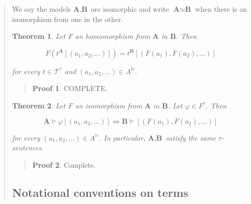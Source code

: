\documentclass[a4paper, 12pt]{article}
\newtheorem{theorem}{Theorem}
\theoremstyle{definition}
\theoremstyle{definition}
\theoremstyle{definition}
\newtheorem{pro}{Proof}
\begin{document}
\begin{quote}
We say the models $\textbf{A}, \textbf{B}$ are isomorphic and write $\textbf{A}
\simeq \textbf{B}$ when there is an isomorphism from one in the other.

\begin{theorem}
    Let $F$ an homomorphism from $\textbf{A}$ in $\textbf{B}$. Then 

    \begin{equation*}
        F \left( t^\textbf{A} \left[ (a_1, a_2, \ldots) \right]  \right) = t^\textbf{B} \left[ (F(a_1), F(a_2), \ldots) \right] 
    \end{equation*}

    for every $t \in \mathcal{T}^\tau$ and $(a_1, a_2, \ldots) \in A^\mathbb{N}$.
\end{theorem}


\small
\begin{quote}

\begin{pro}
    COMPLETE.
\end{pro}

\end{quote}
\normalsize

\begin{theorem}
    Let $F$ an isomorphism from $\textbf{A}$ in $\textbf{B}$. Let $\varphi \in F^\tau$.
    Then 

    \begin{equation*}
        \textbf{A} \vDash \varphi\left[ (a_1, a_2, \ldots) \right] \iff \textbf{B} \vDash \left[ (F(a_1), F(a_2), \ldots) \right] 
    \end{equation*}

    for every $(a_1, a_2, \ldots) \in  A^\mathbb{N}$. In particular, 
    $\textbf{A}, \textbf{B}$ satisfy the same $\tau$-sentences.
\end{theorem}



\small
\begin{quote}

\begin{pro}
    Complete.
\end{pro}

\end{quote}
\normalsize

\subsection{Notational conventions on terms}


\end{quote}
\end{document}
